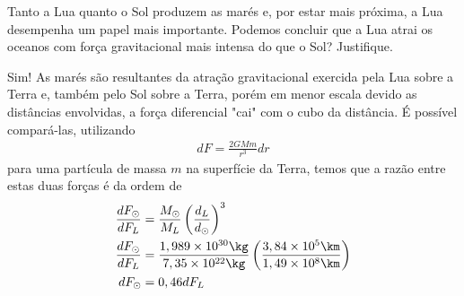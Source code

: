 \begin{prob}
	Tanto a Lua quanto o Sol produzem as marés e, por estar mais próxima, a Lua desempenha
	um papel mais importante. Podemos concluir que a Lua atrai os oceanos com força gravitacional
	mais intensa do que o Sol? Justifique.

	\begin{sol}
		Sim! As marés são resultantes da atração gravitacional exercida pela Lua sobre a Terra e, também pelo Sol sobre a Terra, porém em menor escala devido as distâncias envolvidas, a força diferencial "cai" com o cubo da distância. É possível compará-las, utilizando
		\begin{align}
			dF=\frac{2GMm}{r^3}dr
			\label{eq:forcasDeMare}
		\end{align}
		para uma partícula de massa $m$ na superfície da Terra, temos que a razão entre estas duas forças é da ordem de
	\begin{align}
		\frac{dF_\odot}{dF_L}&=\frac{M_\odot}{M_L}\left(\frac{d_L}{d_\odot}\right)^3\\
		\frac{dF_\odot}{dF_L}&=\frac{1,989\times 10^{30}\kg}{7,35\times 10^{22}\kg}\left(\frac{3,84\times 10^5\km}{1,49\times 10^{8}\km}\right)\\
		dF_\odot&=0,46 dF_L 
	\end{align}
	\end{sol}
\end{prob}
